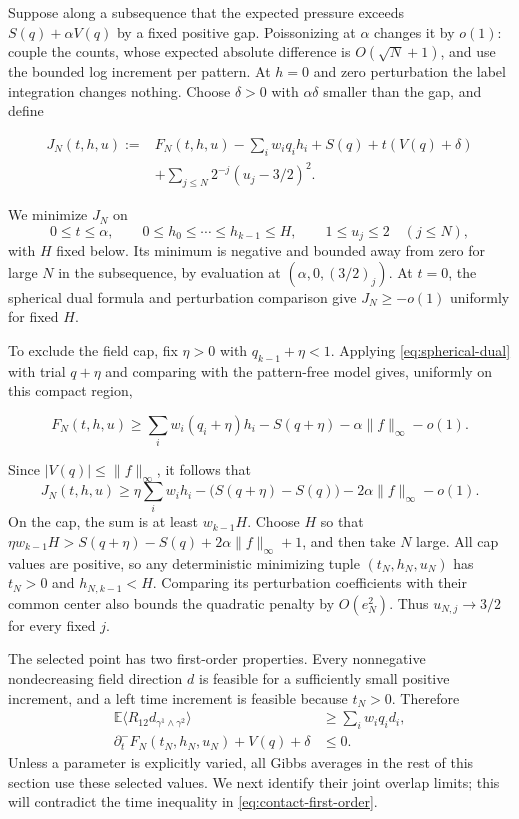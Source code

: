 \documentclass[11pt]{article}
\newcommand{\E}{\mathbb E}
\begin{document}
Suppose along a subsequence that the expected pressure exceeds $S(q)+\alpha V(q)$ by a fixed positive gap. Poissonizing at $\alpha$ changes it by $o(1)$: couple the counts, whose expected absolute difference is $O(\sqrt N+1)$, and use the bounded log increment per pattern. At $h=0$ and zero perturbation the label integration changes nothing. Choose $\delta>0$ with $\alpha\delta$ smaller than the gap, and define

\begin{equation}\label{eq:contact-objective}
\begin{aligned}
J_N(t,h,u):={}&F_N(t,h,u)-\sum_i w_i q_i h_i+S(q)+t(V(q)+\delta)\\
 &+\sum_{j\le N} 2^{-j}(u_j-3/2)^2.
\end{aligned}
\end{equation}

We minimize $J_N$ on
\[
 0\le t\le\alpha,\qquad 0\le h_0\le\cdots\le h_{k-1}\le H,
 \qquad 1\le u_j\le2\quad(j\le N),
\]
with $H$ fixed below. Its minimum is negative and bounded away from zero for large $N$ in the subsequence, by evaluation at $(\alpha,0,(3/2)_j)$. At $t=0$, the spherical dual formula and perturbation comparison give $J_N\ge-o(1)$ uniformly for fixed $H$.

To exclude the field cap, fix $\eta>0$ with $q_{k-1}+\eta<1$. Applying \eqref{eq:spherical-dual} with trial $q+\eta$ and comparing with the pattern-free model gives, uniformly on this compact region,

\begin{equation*}
F_N(t,h,u)\ge \sum_i w_i(q_i+\eta)h_i-S(q+\eta)-\alpha\|f\|_\infty-o(1).
\end{equation*}

Since $|V(q)|\le\|f\|_\infty$, it follows that
\[
 J_N(t,h,u)\ge\eta\sum_iw_i h_i-\bigl(S(q+\eta)-S(q)\bigr)
                   -2\alpha\|f\|_\infty-o(1).
\]
On the cap, the sum is at least $w_{k-1}H$. Choose $H$ so that
$\eta w_{k-1}H>S(q+\eta)-S(q)+2\alpha\|f\|_\infty+1$, and then take $N$ large. All cap values are positive, so any deterministic minimizing tuple $(t_N,h_N,u_N)$ has $t_N>0$ and $h_{N,k-1}<H$. Comparing its perturbation coefficients with their common center also bounds the quadratic penalty by $O(e_N^2)$. Thus $u_{N,j}\to3/2$ for every fixed $j$.

The selected point has two first-order properties. Every nonnegative nondecreasing field direction $d$ is feasible for a sufficiently small positive increment, and a left time increment is feasible because $t_N>0$. Therefore
\begin{equation}\label{eq:contact-first-order}
\begin{aligned}
 \E\langle R_{12}d_{\gamma^1\wedge\gamma^2}\rangle
       &\ge\sum_i w_iq_i d_i,\\
 \partial_t^-F_N(t_N,h_N,u_N)+V(q)+\delta&\le0.
\end{aligned}
\end{equation}
Unless a parameter is explicitly varied, all Gibbs averages in the rest of this section use these selected values. We next identify their joint overlap limits; this will contradict the time inequality in \eqref{eq:contact-first-order}.
\end{document}
